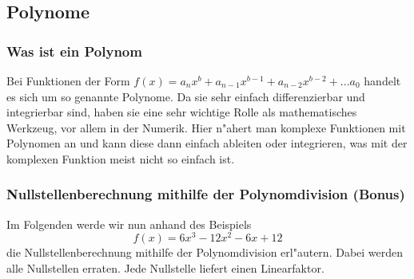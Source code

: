 \subsection{Polynome}
\subsubsection{Was ist ein Polynom}
Bei Funktionen der Form $f(x) = a_n x^b + a_{n-1} x^{b-1} + a_{n-2} x^{b-2} + ... a_0$ handelt es sich um so genannte Polynome. Da sie sehr einfach differenzierbar und integrierbar sind, haben sie eine sehr wichtige Rolle als mathematisches Werkzeug, vor allem in der Numerik. Hier n"ahert man komplexe Funktionen mit Polynomen an und kann diese dann einfach ableiten oder integrieren, was mit der komplexen Funktion meist nicht so einfach ist.

\subsubsection{Nullstellenberechnung mithilfe der Polynomdivision (Bonus)}
Im Folgenden werde wir nun anhand des Beispiels 
\begin{equation*}
f(x) = 6x^3 - 12x^2 - 6x + 12
\end{equation*}
die Nullstellenberechnung mithilfe der Polynomdivision erl"autern. Dabei werden alle Nullstellen erraten. Jede Nullstelle liefert einen Linearfaktor. 
